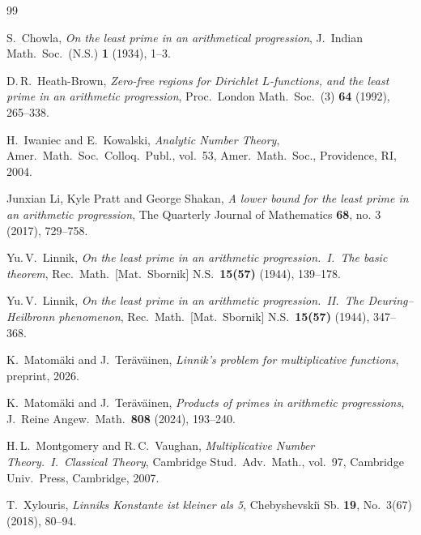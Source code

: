 \documentclass[11pt]{amsart}
\begin{document}
\begin{thebibliography}{99}
 
S.~Chowla,
\textit{On the least prime in an arithmetical progression},
J.~Indian Math.\ Soc.\ (N.S.) \textbf{1} (1934), 1--3.

D.\,R.~Heath-Brown,
\textit{Zero-free regions for Dirichlet $L$-functions, and the least prime in an arithmetic progression},
Proc.\ London Math.\ Soc.\ (3) \textbf{64} (1992), 265--338.

H.~Iwaniec and E.~Kowalski,
\textit{Analytic Number Theory},
Amer.\ Math.\ Soc.\ Colloq.\ Publ., vol.~53,
Amer.\ Math.\ Soc., Providence, RI, 2004.

Junxian Li, Kyle Pratt and George Shakan,
\textit{A lower bound for the least prime in an arithmetic progression},
The Quarterly Journal of Mathematics {\bf 68}, no. 3 (2017), 729--758.

Yu.\,V.~Linnik,
\textit{On the least prime in an arithmetic progression.\ I.\ The basic theorem},
Rec.\ Math.\ [Mat.\ Sbornik] N.S.\ \textbf{15(57)} (1944), 139--178.

Yu.\,V.~Linnik,
\textit{On the least prime in an arithmetic progression.\ II.\ The Deuring--Heilbronn phenomenon},
Rec.\ Math.\ [Mat.\ Sbornik] N.S.\ \textbf{15(57)} (1944), 347--368.

K.~Matom\"aki and J.~Ter\"av\"ainen,
\textit{Linnik's problem for multiplicative functions},
preprint, 2026.

K.~Matom\"aki and J.~Ter\"av\"ainen,
\textit{Products of primes in arithmetic progressions},
J.~Reine Angew.\ Math.\ \textbf{808} (2024), 193--240.

H.\,L.~Montgomery and R.\,C.~Vaughan,
\textit{Multiplicative Number Theory.\ I.\ Classical Theory},
Cambridge Stud.\ Adv.\ Math., vol.~97,
Cambridge Univ.\ Press, Cambridge, 2007.

T.~Xylouris,
\emph{Linniks Konstante ist kleiner als 5}, Chebyshevski\u{\i} Sb. \textbf{19}, No.~3(67) (2018), 80--94.

\end{thebibliography}
\end{document}
